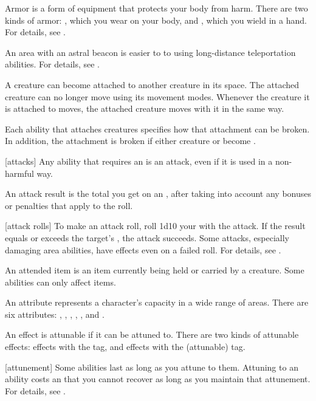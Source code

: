  Armor is a form of equipment that protects your body from harm.
There are two kinds of armor: , which you wear on your body, and , which you wield in a hand.
For details, see .

 An area with an astral beacon is easier to  to using long-distance teleportation abilities.
For details, see .

 A creature can become attached to another creature in its space.
The attached creature can no longer move using its movement modes.
Whenever the creature it is attached to moves, the attached creature moves with it in the same way.

Each ability that attaches creatures specifies how that attachment can be broken.
In addition, the attachment is broken if either creature  or become .

[attacks] Any ability that requires an  is an attack, even if it is used in a non-harmful way.

 An attack result is the total you get on an , after taking into account any bonuses or penalties that apply to the roll.

[attack rolls] To make an attack roll, roll 1d10 \add your  with the attack.
If the result equals or exceeds the target's , the attack succeeds.
Some attacks, especially damaging area abilities, have effects even on a failed roll.
For details, see .

 An attended item is an item currently being held or carried by a creature.
Some abilities can only affect  items.

 An attribute represents a character's capacity in a wide range of areas.
There are six attributes: , , , , , and .

 An effect is attunable if it can be attuned to.
There are two kinds of attunable effects: effects with the \atAttune tag, and effects with the \atSustain (attunable) tag.

[attunement] Some abilities last as long as you attune to them.
Attuning to an ability costs an  that you cannot recover as long as you maintain that attunement.
For details, see .

